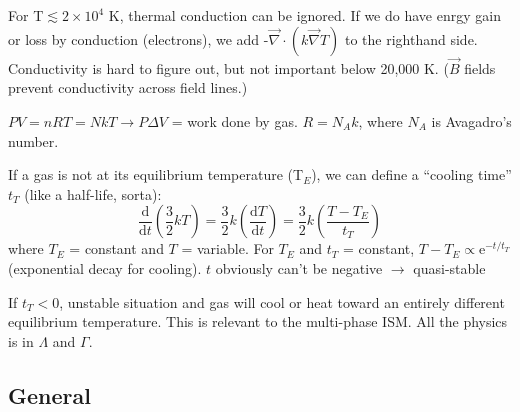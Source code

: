 \documentclass[12pt]{article}
\newcommand{\mar}[1]{\hspace{0pt}\marginpar{-\textcolor{black}{#1}-}}
\newcommand{\mynotes}[1]{\textcolor{mygreen}{#1}}
\begin{document}
For T$\lesssim2\times10^{4}$ K, thermal conduction can be ignored.
If we do have enrgy gain or loss by conduction (electrons), we add
-$\vec{\nabla}\cdot\left(k\vec{\nabla}T\right)$ to the righthand side.
\mynotes{Conductivity is hard to figure out, but not important below 20,000 K.}
($\vec{B}$ fields prevent conductivity across field lines.)

\mynotes{ $PV = nRT = NkT \rightarrow P\Delta{V} $ = work done by gas.
$R = N_{A}k$, where $N_{A}$ is Avagadro's number.}

If a gas is not at its equilibrium temperature (T$_{E}$), we can
define a ``cooling time'' $t_{T}$ \mynotes{(like a half-life, sorta)}:
\[
    \frac{\mathrm{d}}{\mathrm{d}t}\left(\frac{3}{2}kT\right) =
    \frac{3}{2}k\left(\frac{\mathrm{d}T}{\mathrm{d}t} \right) =
    \frac{3}{2}k\left(\frac{T-T_{E}}{t_{T}}\right)
    \]
where $T_{E}$ = constant and $T$ = variable. For $T_{E}$ and $t_{T}$
= constant, $T-T_{E} \propto \mathrm{e}^{-t/t_{T}}$
\mynotes{(exponential decay for cooling). $t$ obviously can't be negative
$\rightarrow$ quasi-stable}

\mar{152}If $t_{T} < 0$, unstable situation and gas will cool or heat
toward an entirely different equilibrium temperature. This is relevant
to the multi-phase ISM. All the physics is in $\Lambda$ and $\Gamma$.

\subsection{General}
\end{document}
